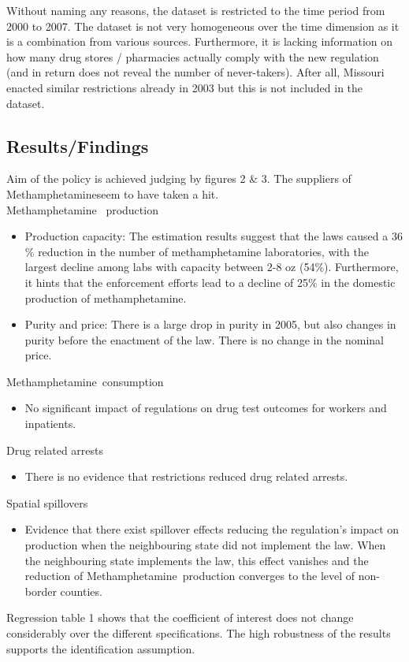 \documentclass[%
  fontsize=11pt, %
  version=last,%
  headsepline,
  titlepage = false,
  DIV = 11, %
  abstract = false
]{scrartcl}
\newcommand{\meth}{Methamphetamine} %
\begin{document}
Without naming any reasons, the dataset is restricted to the time period from 2000 to 2007. The dataset is not very homogeneous over the time dimension as it is a combination from various sources. Furthermore, it is lacking information on how many drug stores / pharmacies actually comply with the new regulation (and in return does not reveal the number of never-takers). After all, Missouri enacted similar restrictions already in 2003 but this is not included in the dataset. %

\subsection*{Results/Findings}
Aim of the policy is achieved judging by figures 2 \& 3. The suppliers of \meth seem to have taken a hit. \\
\meth~ production
\begin{itemize}[noitemsep, topsep=1pt]
	\item Production capacity:
	The estimation results suggest that the laws caused a 36$\%$ reduction in the number of methamphetamine laboratories, with the largest decline among labs with capacity between 2-8 oz (54\%). Furthermore, it hints that the enforcement efforts lead to a decline of 25$\%$ in the domestic production of methamphetamine.
	\item Purity and price:
	There is a large drop in purity in 2005, but also changes in purity before the enactment of the law. There is no change in the nominal price.
\end{itemize} \vspace{0.5em}
\meth~consumption
\begin{itemize}[noitemsep, topsep=1pt]
	\item No significant impact of regulations on drug test outcomes for workers and inpatients.
\end{itemize} \vspace{0.5em}
Drug related arrests
\begin{itemize}[noitemsep, topsep=1pt]
	\item There is no evidence that restrictions reduced drug related arrests. 
\end{itemize} \vspace{0.5em}
Spatial spillovers
\begin{itemize}[noitemsep, topsep=1pt]
	\item Evidence that there exist spillover effects reducing the regulation's impact on production when the neighbouring state did not implement the law. When the neighbouring state implements the law, this effect vanishes and the reduction of \meth~production converges to the level of non-border counties.
\end{itemize}
Regression table 1 shows that the coefficient of interest does not change considerably over the different specifications. The high robustness of the results supports the identification assumption. 
\end{document}
